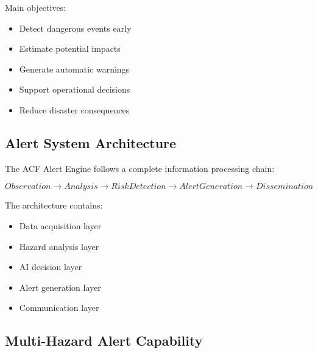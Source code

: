 Main objectives:

\begin{itemize}

\item Detect dangerous events early

\item Estimate potential impacts

\item Generate automatic warnings

\item Support operational decisions

\item Reduce disaster consequences

\end{itemize}



\subsection{Alert System Architecture}

The ACF Alert Engine follows a complete information processing chain:

\[
Observation
\rightarrow
Analysis
\rightarrow
RiskDetection
\rightarrow
AlertGeneration
\rightarrow
Dissemination
\]


The architecture contains:

\begin{itemize}

\item Data acquisition layer

\item Hazard analysis layer

\item AI decision layer

\item Alert generation layer

\item Communication layer

\end{itemize}



\subsection{Multi-Hazard Alert Capability}

